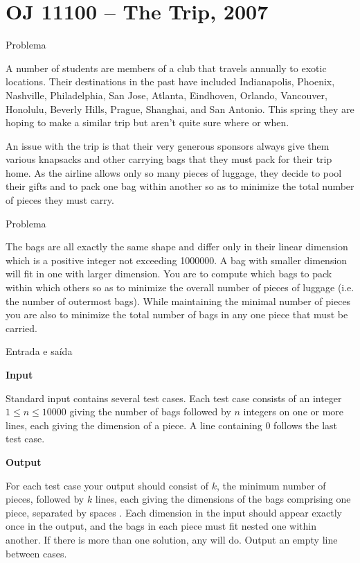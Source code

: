 \section{OJ 11100 -- The Trip, 2007}

\begin{frame}[fragile]{Problema}

A number of students are members of a club that travels annually to exotic locations. Their 
destinations in the past have included Indianapolis, Phoenix, Nashville, Philadelphia, San Jose, 
Atlanta, Eindhoven, Orlando, Vancouver, Honolulu, Beverly Hills, Prague, Shanghai, and 
San Antonio. This spring they are hoping to make a similar trip but aren’t quite sure where or when.

An issue with the trip is that their very generous sponsors always give them various knapsacks and 
other carrying bags that they must pack for their trip home.  As the airline allows only so many 
pieces of luggage, they decide to pool their gifts and to pack one bag within another so as to 
minimize the total number of pieces they must carry.

\end{frame}

\begin{frame}[fragile]{Problema}

The bags are all exactly the same shape and differ only in their linear dimension which is a 
positive integer not exceeding 1000000. A bag with smaller dimension will fit in one with larger 
dimension. You are to compute which bags to pack within which others so as to minimize the overall 
number of pieces of luggage (i.e. the number of outermost bags). While maintaining the minimal 
number of pieces you are also to minimize the total number of bags in any one piece that must be 
carried.

\end{frame}

\begin{frame}[fragile]{Entrada e saída}

\textbf{Input}

Standard input contains several test cases. Each test case consists of an integer 
$1\leq n\leq 10000$ giving the number of bags followed by $n$ integers on one or more lines, 
each giving the dimension of a piece.  A line containing $0$ follows the last test case.

\vspace{0.1in}

\textbf{Output}

For each test case your output should consist of $k$, the minimum number of pieces, followed by 
$k$ lines, each giving the dimensions of the bags comprising one piece, separated by spaces
. Each dimension in the input should appear exactly once in the output, and the bags in each piece 
must fit nested one
within another. If there is more than one solution, any will do. Output an empty line between cases.

\end{frame}

